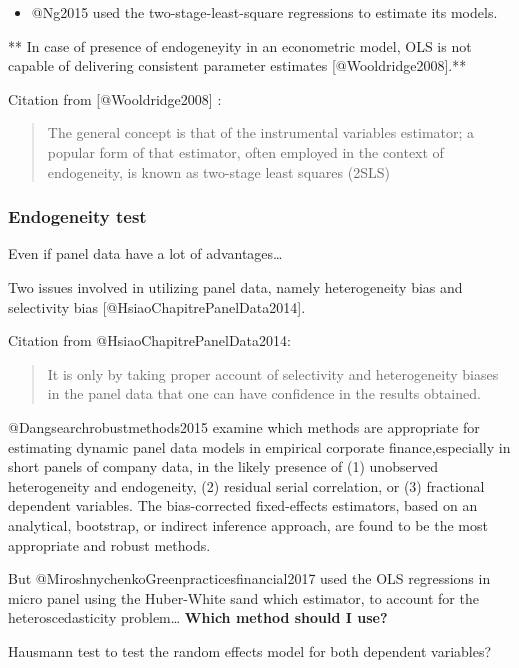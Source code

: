 \documentclass[]{article}
\providecommand{\tightlist}{%
  \setlength{\itemsep}{0pt}\setlength{\parskip}{0pt}}
\begin{document}
\begin{itemize}
\tightlist
\item
  @Ng2015 used the two-stage-least-square regressions to estimate its
  models.
\end{itemize}

** In case of presence of endogeneyity in an econometric model, OLS is
not capable of delivering consistent parameter estimates
{[}@Wooldridge2008{]}.**

Citation from {[}@Wooldridge2008{]} :

\begin{quote}
The general concept is that of the instrumental variables estimator; a
popular form of that estimator, often employed in the context of
endogeneity, is known as two-stage least squares (2SLS)
\end{quote}

\subsubsection{Endogeneity test}\label{endogeneity-test}

Even if panel data have a lot of advantages\ldots{}

Two issues involved in utilizing panel data, namely heterogeneity bias
and selectivity bias {[}@HsiaoChapitrePanelData2014{]}.

Citation from @HsiaoChapitrePanelData2014:

\begin{quote}
It is only by taking proper account of selectivity and heterogeneity
biases in the panel data that one can have confidence in the results
obtained.
\end{quote}

@Dangsearchrobustmethods2015 examine which methods are appropriate for
estimating dynamic panel data models in empirical corporate
finance,especially in short panels of company data, in the likely
presence of (1) unobserved heterogeneity and endogeneity, (2) residual
serial correlation, or (3) fractional dependent variables. The
bias-corrected fixed-effects estimators, based on an analytical,
bootstrap, or indirect inference approach, are found to be the most
appropriate and robust methods.

But @MiroshnychenkoGreenpracticesfinancial2017 used the OLS regressions
in micro panel using the Huber-White sand which estimator, to account
for the heteroscedasticity problem\ldots{} \textbf{Which method should I
use?}

Hausmann test to test the random effects model for both dependent
variables?
\end{document}
